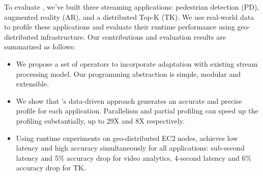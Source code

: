 To evaluate \sysname{}, we've built three streaming applications: pedestrian
detection (PD), augmented reality (AR), and a distributed Top-K (TK). We use
real-world data to profile these applications and evaluate their runtime
performance using geo-distributed infrastructure. Our contributions and
evaluation results are summarized as follows:

\begin{itemize}[leftmargin=16pt]

\item We propose a set of \maybe{} operators to incorporate adaptation with
  existing stream processing model. Our programming abstraction is simple,
  modular and extensible.

\item We show that \sysname{}'s data-driven approach generates an accurate and
  precise profile for each application. Parallelism and partial profiling can
  speed up the profiling substantially, up to 29X and 8X respectively.

\item Using runtime experiments on geo-distributed EC2 nodes, \sysname{}
  achieves low latency and high accuracy simultaneously for all applications:
  sub-second latency and 5\% accuracy drop for video analytics, 4-second latency
  and 6\% accuracy drop for TK.

\end{itemize}


